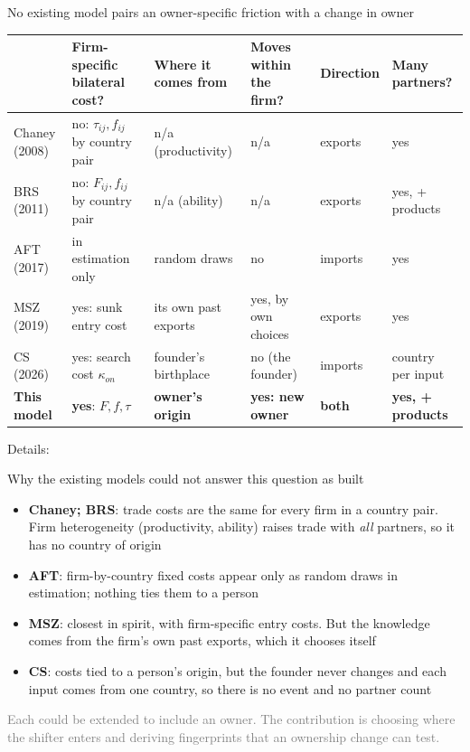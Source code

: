 \documentclass[notes,11pt, aspectratio=169]{beamer}
\begin{document}
\begin{frame}[label=compare]{No existing model pairs an owner-specific friction with a change in owner}
\scriptsize
\renewcommand{\arraystretch}{1.25}
\begin{tabularx}{\textwidth}{@{}>{\raggedright\arraybackslash}p{2.2cm}>{\raggedright\arraybackslash}p{3.0cm}YYp{1.3cm}>{\raggedright\arraybackslash}p{1.8cm}@{}}
\toprule
 & \textbf{Firm-specific bilateral cost?} & \textbf{Where it comes from} & \textbf{Moves within the firm?} & \textbf{Direction} & \textbf{Many partners?}\\
\midrule
Chaney (2008) & no: $\tau_{ij},f_{ij}$ by country pair & n/a (productivity) & n/a & exports & yes\\
BRS (2011) & no: $F_{ij},f_{ij}$ by country pair & n/a (ability) & n/a & exports & yes, + products\\
AFT (2017) & in estimation only & random draws & no & imports & yes\\
MSZ (2019) & yes: sunk entry cost & its own past exports & yes, by own choices & exports & yes\\
CS (2026) & yes: search cost $\kappa_{on}$ & founder's birthplace & no (the founder) & imports & 1 country per input\\
\midrule
\textbf{This model} & \textbf{yes}: $F,f,\tau$ & \textbf{owner's origin} & \textbf{yes: new owner} & \textbf{both} & \textbf{yes, + products}\\
\bottomrule
\end{tabularx}
\vspace{0.3cm}

\normalsize
Details:
\hyperlink{app-chaney}{}
\hyperlink{app-brs}{}
\hyperlink{app-aft}{}
\hyperlink{app-msz}{}
\hyperlink{app-cs}{}
\end{frame}


\begin{frame}{Why the existing models could not answer this question as built}
\small
\begin{itemize}\setlength{\itemsep}{5pt}
\item \textbf{Chaney; BRS}: trade costs are the same for every firm in a country pair. Firm heterogeneity (productivity, ability) raises trade with \emph{all} partners, so it has no country of origin
\item \textbf{AFT}: firm-by-country fixed costs appear only as random draws in estimation; nothing ties them to a person
\item \textbf{MSZ}: closest in spirit, with firm-specific entry costs. But the knowledge comes from the firm's own past exports, which it chooses itself
\item \textbf{CS}: costs tied to a person's origin, but the founder never changes and each input comes from one country, so there is no event and no partner count
\end{itemize}
\pause
\textcolor{gray}{Each could be extended to include an owner. The contribution is choosing where the shifter enters and deriving fingerprints that an ownership change can test.}
\end{frame}
\end{document}
